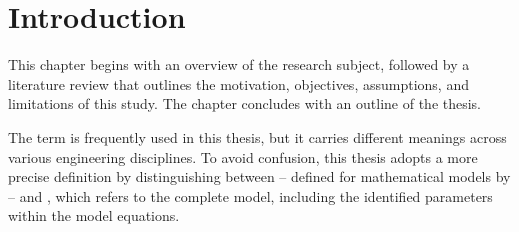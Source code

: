 \chapter{Introduction}
\noindent This chapter begins with an overview of the research subject, followed by a literature review that outlines the motivation, objectives, assumptions, and limitations of this study. The chapter concludes with an outline of the thesis.

The term  is frequently used in this thesis, but it carries different meanings across various engineering disciplines. To avoid confusion, this thesis adopts a more precise definition by distinguishing between  -- defined for mathematical models by  -- and , which refers to the complete model, including the identified parameters within the model equations.







